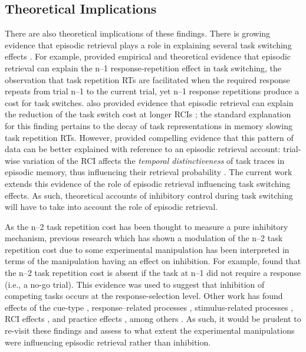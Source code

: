 \documentclass[a4paper, doc, natbib]{apa6}
\begin{document}
\subsection{Theoretical Implications}
There are also theoretical implications of these findings. There is growing evidence that episodic retrieval plays a role in explaining several task switching effects \citep[e.g.,][for a model of task switching based on episodic retrieval]{Altmann2008}. For example, \cite{Altmann2011} provided empirical and theoretical evidence that episodic retrieval can explain the n--1 response-repetition effect in task switching, the observation that task repetition RTs are facilitated when the required response repeats from trial n--1 to the current trial, yet n--1 response repetitions produce a cost for task switches. \cite{Horoufchin2011a} \citep[see also][]{Horoufchin2011} also provided evidence that episodic retrieval can explain the reduction of the task switch cost at longer RCIs \citep[e.g.,][]{Meiran2000a}; the standard explanation for this finding pertains to the decay of task representations in memory slowing task repetition RTs. However, \cite{Horoufchin2011a} provided compelling evidence that this pattern of data can be better explained with reference to an episodic retrieval account: trial-wise variation of the RCI affects the \emph{temporal distinctiveness} of task traces in episodic memory, thus influencing their retrieval probability \citep{Brown2007, Grange2015, Grange2016}. The current work extends this evidence of the role of episodic retrieval influencing task switching effects. As such, theoretical accounts of inhibitory control during task switching will have to take into account the role of episodic retrieval.

As the n--2 task repetition cost has been thought to measure a pure inhibitory mechanism, previous research which has shown a modulation of the n--2 task repetition cost due to some experimental manipulation has been interpreted in terms of the manipulation having an effect on inhibition. For example, \cite{Schuch2003} found that the n--2 task repetition cost is absent if the task at n--1 did not require a response (i.e., a no-go trial). This evidence was used to suggest that inhibition of competing tasks occurs at the response-selection level. Other work has found effects of the cue-type \citep{Arbuthnott2005, Grange2009, Grange2010, Houghton2009}, response--related processes \citep{Philipp2007, Schneider2008}, stimulus-related processes \citep{Sdoia2008}, RCI effects \citep{Gade2005}, and practice effects \citep{Grange2015a, Scheil2016}, among others \citep{Koch2010}. As such, it would be prudent to re-visit these findings and assess to what extent the experimental manipulations were influencing episodic retrieval rather than inhibition. 
\end{document}
